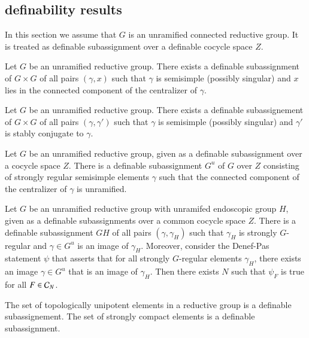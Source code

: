 \subsection{definability results}\label{sec:definability}

In this section we assume that $G$ is an unramified connected reductive group.  It is treated  as definable subassignment
over a definable cocycle space $Z$.

\begin{lemma}  Let $G$ be an unramified reductive group.  There exists a definable subassignment of $G\times G$ of all pairs
$(\gamma,x)$ such that $\gamma$ is semisimple (possibly singular) and $x$ lies in the connected component of the centralizer of $\gamma$.
\end{lemma}

\begin{lemma} Let $G$ be an unramified reductive group.  There exists a definable subassignement of $G\times G$ of all pairs
$(\gamma,\gamma')$ such that $\gamma$ is semisimple (possibly singular) and $\gamma'$ is stably conjugate to $\gamma$.
\end{lemma}

\begin{lemma} Let $G$ be an unramified reductive group, given as a definable subassignment over a cocycle space $Z$.
There is a definable subassignment $G^u$ of $G$ over $Z$ 
consisting of strongly regular semisimple elements $\gamma$ such that
the connected component of the centralizer of $\gamma$ is unramified. 
\end{lemma}

\begin{lemma} Let $G$ be an unramified reductive group with unramifed endoscopic group $H$, given as a definable subassignments over a common cocycle space $Z$.
There is a definable subassignment $GH$ of all pairs $(\gamma,\gamma_H)$ such that $\gamma_H$ is strongly $G$-regular and $\gamma\in G^u$ is an image of $\gamma_H$.
Moreover,
consider the Denef-Pas statement $\psi$ that asserts that for all strongly $G$-regular elements $\gamma_H$, there exists an image $\gamma\in G^u$ that is an image of $\gamma_H$.
Then there exists $N$ such that $\psi_F$ is true for all $F\in\mathcal C_N$.
\end{lemma}

\begin{lemma} The set of topologically unipotent elements in a reductive group is a definable subassignement.
The set of strongly compact elements is a definable subassignment.
\end{lemma}

